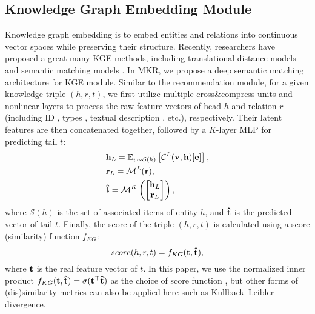 \documentclass[sigconf]{acmart}
\begin{document}
	\subsection{Knowledge Graph Embedding Module}
	\label{section:kgem}
		Knowledge graph embedding is to embed entities and relations into continuous vector spaces while preserving their structure.
		Recently, researchers have proposed a great many KGE methods, including translational distance models \cite{bordes2013translating,lin2015learning} and semantic matching models \cite{nickel2016holographic,liu2017analogical}.
		In MKR, we propose a deep semantic matching architecture for KGE module.
		Similar to the recommendation module, for a given knowledge triple $(h, r, t)$, we first utilize multiple cross$\&$compress units and nonlinear layers to process the raw feature vectors of head $h$ and relation $r$ (including ID \cite{lin2015learning}, types \cite{xie2016representation}, textual description \cite{wang2014knowledge}, etc.), respectively.
		Their latent features are then concatenated together, followed by a $K$-layer MLP for predicting tail $t$:
		\begin{equation}
		\begin{split}
			&{\bf h}_L = \mathbb E_{v \sim \mathcal S(h)} \left[ \mathcal C^L ({\bf v}, {\bf h})[{\bf e}] \right],\\
			&{\bf r}_L = \mathcal M^L ({\bf r}),\\
			&{\bf \hat t} = \mathcal M^K \left(
			\begin{bmatrix}
				{\bf h}_L\\
				{\bf r}_L
			\end{bmatrix} \right),
		\end{split}
		\end{equation}
		where $\mathcal S(h)$ is the set of associated items of entity $h$, and $\bf \hat t$ is the predicted vector of tail $t$.
		Finally, the score of the triple $(h, r, t)$ is calculated using a score (similarity) function $f_{KG}$:
		\begin{equation}
			score(h, r, t) = f_{KG}({\bf t}, {\bf \hat t}),
		\end{equation}
		where $\bf t$ is the real feature vector of $t$.
		In this paper, we use the normalized inner product $f_{KG}({\bf t}, {\bf \hat t}) = \sigma({\bf t}^\top {\bf \hat t})$ as the choice of score function \cite{misra2016cross}, but other forms of (dis)similarity metrics can also be applied here such as Kullback–Leibler divergence.
	
	
\end{document}
